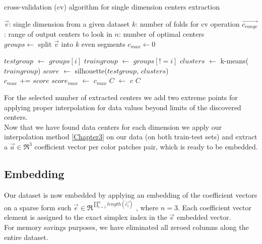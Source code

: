 \begin{algorithm}[H]
	\caption{cross-validation (cv) algorithm for single dimension centers extraction}
	\begin{algorithmic}		
		
		\REQUIRE $\overrightarrow{v}$: single dimension from a given dataset 
		\REQUIRE $k$: number of folds for cv operation
		\REQUIRE $\overrightarrow{c_{range}}$: range of output centers to look in
		\ENSURE $n$: number of optimal centers\\
		\STATE $groups \leftarrow$ split $\overrightarrow{v}$ into $k$ even segments
		\STATE $c_{max} \leftarrow 0$  
		
		\STATE $test group$ $\leftarrow$ $groups[i]$
		\STATE $train group$ $\leftarrow$ $groups[!=i]$		
		\STATE $clusters$ $\leftarrow$ k-means($train group$)
		\STATE $score$ $\leftarrow$ silhouette($test group$, $clusters$)\\
		\STATE $c_{max}$ += $score$
		\ENDFOR
			\STATE $score_{max}$ $\leftarrow$ $c_{max}$
			\STATE $C$ $\leftarrow$ $c$
			\ENDIF
		\ENDFOR	
		\RETURN $C$	
		
	\end{algorithmic}
	\label{cross_validation}
\end{algorithm}	


For the selected number of extracted centers we add two extreme points for applying proper interpolation for data values beyond limits of the discovered centers.
\\
Now that we have found data centers for each dimension we apply our interpolation method \ref{Chapter3} on our data (on both train-test sets) and extract a $\overrightarrow{a} \in \Re^3$ coefficient vector per color patches pair, which is ready to be embedded.


\subsection{Embedding}
Our dataset is now embedded by applying an embedding of the coefficient vectors on a sparse form such $\overrightarrow{e} \in \Re^{\prod_{i=1}^{n}{length(\overrightarrow{c_i})}}$ , where $n = 3$.
Each coefficient vector element is assigned to the exact simplex index in the $\overrightarrow{e}$ embedded vector.
\\
For memory savings purposes, we have eliminated all zeroed columns along the entire dataset.

